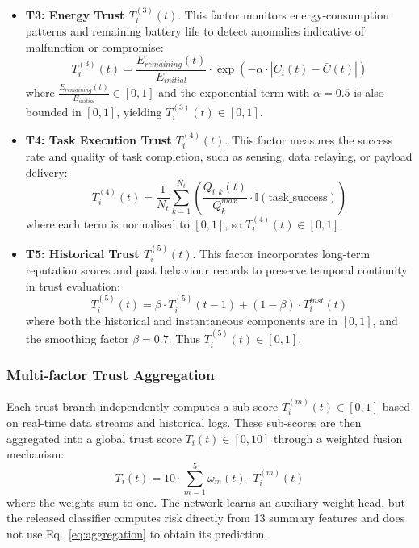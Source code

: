 \documentclass[notspecified,article,submit,moreauthors]{Definitions/mdpi}
\begin{document}
\begin{itemize}
\item \textbf{T3: Energy Trust $T_i^{(3)}(t)$}. This factor monitors energy-consumption patterns and remaining battery life to detect anomalies indicative of malfunction or compromise:
\begin{equation}\label{eq:T3}
T_i^{(3)}(t) = \frac{E_{remaining}(t)}{E_{initial}} \cdot \exp\left(-\alpha \cdot \left|C_i(t) - \bar{C}(t)\right|\right)
\end{equation}
where $\frac{E_{remaining}(t)}{E_{initial}} \in [0, 1]$ and the exponential term with $\alpha = 0.5$ is also bounded in $[0, 1]$, yielding $T_i^{(3)}(t) \in [0, 1]$.
\end{itemize}

\begin{itemize}
\item \textbf{T4: Task Execution Trust $T_i^{(4)}(t)$}. This factor measures the success rate and quality of task completion, such as sensing, data relaying, or payload delivery:
\begin{equation}\label{eq:T4}
T_i^{(4)}(t) = \frac{1}{N_t} \sum_{k=1}^{N_t} \left( \frac{Q_{i,k}(t)}{Q_k^{max}} \cdot \mathbb{I}(\mathrm{task\_success}) \right)
\end{equation}
where each term is normalised to $[0, 1]$, so $T_i^{(4)}(t) \in [0, 1]$.
\end{itemize}

\begin{itemize}
\item \textbf{T5: Historical Trust $T_i^{(5)}(t)$}. This factor incorporates long-term reputation scores and past behaviour records to preserve temporal continuity in trust evaluation:
\begin{equation}\label{eq:T5}
T_i^{(5)}(t) = \beta \cdot T_i^{(5)}(t-1) + (1 - \beta) \cdot T_i^{inst}(t)
\end{equation}
where both the historical and instantaneous components are in $[0, 1]$, and the smoothing factor $\beta = 0.7$. Thus $T_i^{(5)}(t) \in [0, 1]$.
\end{itemize}

\subsubsection{Multi-factor Trust Aggregation}
\label{sec:multi_factor_aggregation}
Each trust branch independently computes a sub-score $T_i^{(m)}(t) \in [0, 1]$ based on real-time data streams and historical logs. These sub-scores are then aggregated into a global trust score $T_i(t) \in [0, 10]$ through a weighted fusion mechanism:
\begin{equation}\label{eq:aggregation}
T_i(t) = 10 \cdot \sum_{m=1}^{5} \omega_m(t) \cdot T_i^{(m)}(t)
\end{equation}
where the weights sum to one. The network learns an auxiliary weight head, but the released classifier computes risk directly from 13 summary features and does not use Eq.~\ref{eq:aggregation} to obtain its prediction.
\end{document}

